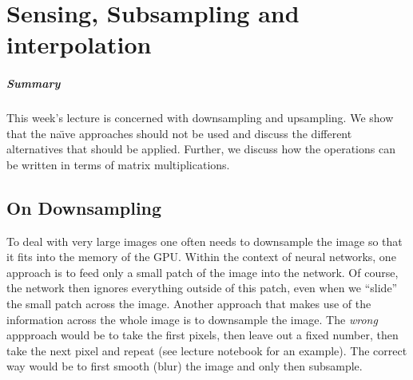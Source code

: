\chapter{Sensing, Subsampling and interpolation}%
\label{chap:02}
\setcounter{section}{1}

\paragraph{Summary} This week's lecture is concerned with downsampling and
upsampling. We show that the na\"\i{}ve approaches should not be used and
discuss the different alternatives that should be applied. Further, we discuss
how the operations can be written in terms of matrix multiplications.

\section{On Downsampling}
To deal with very large images one often needs to downsample the image so that
it fits into the memory of the GPU. Within the context of neural networks, one
approach is to feed only a small patch of the image into the network. Of course,
the network then ignores everything outside of this patch, even when we
``slide'' the small patch across the image. Another approach that makes use of
the information across the whole image is to downsample the image. The
\emph{wrong} appproach would be to take the first pixels, then leave out a fixed
number, then take the next pixel and repeat (see lecture notebook for an
example). The correct way would be to first smooth (blur) the image and only
then subsample.

